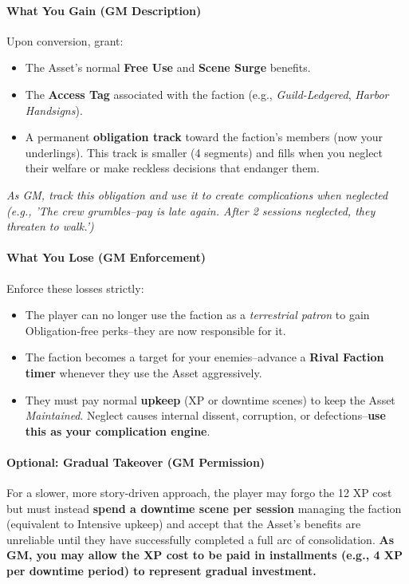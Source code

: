 \begin{tcolorbox}[colback=black!3!white,colframe=black!60!white,title=From Faction to Asset/Follower: Taking Over a Terrestrial Patron (GM Guidance),label=sec:takeover-sidebar,breakable]
\paragraph{What You Gain (GM Description)}
Upon conversion, grant:  
\begin{itemize}
  \item The Asset's normal \textbf{Free Use} and \textbf{Scene Surge} benefits.  
  \item The \textbf{Access Tag} associated with the faction (e.g., \textit{Guild-Ledgered}, \textit{Harbor Handsigns}).  
  \item A permanent \textbf{obligation track} toward the faction's members (now your underlings). This track is smaller (4 segments) and fills when you neglect their welfare or make reckless decisions that endanger them.  
\end{itemize}
\textit{As GM, track this obligation and use it to create complications when neglected (e.g., 'The crew grumbles--pay is late again. After 2 sessions neglected, they threaten to walk.')}

\paragraph{What You Lose (GM Enforcement)}
Enforce these losses strictly:  
\begin{itemize}
  \item The player can no longer use the faction as a \emph{terrestrial patron} to gain Obligation-free perks--they are now responsible for it.  
  \item The faction becomes a target for your enemies--advance a \textbf{Rival Faction timer} whenever they use the Asset aggressively.  
  \item They must pay normal \textbf{upkeep} (XP or downtime scenes) to keep the Asset \emph{Maintained}. Neglect causes internal dissent, corruption, or defections--\textbf{use this as your complication engine}.  
\end{itemize}

\paragraph{Optional: Gradual Takeover (GM Permission)}
For a slower, more story-driven approach, the player may forgo the 12 XP cost but must instead \textbf{spend a downtime scene per session} managing the faction (equivalent to Intensive upkeep) and accept that the Asset's benefits are unreliable until they have successfully completed a full arc of consolidation. \textbf{As GM, you may allow the XP cost to be paid in installments (e.g., 4 XP per downtime period) to represent gradual investment.}  


\end{tcolorbox}
